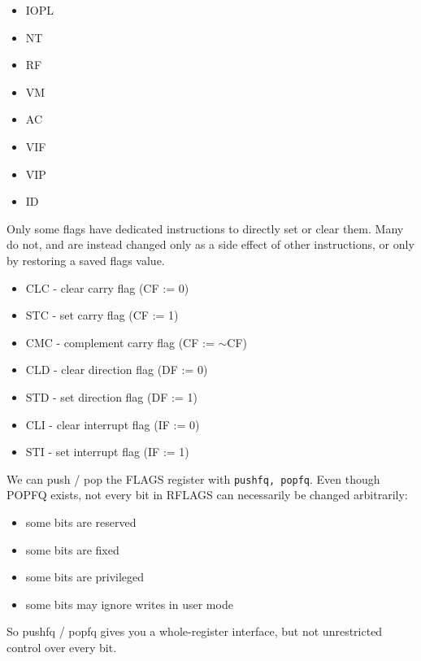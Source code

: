 \documentclass{report}
\begin{document}
\begin{itemize}
\begin{enumerate}
                    \begin{itemize}
                        \item IOPL
                        \item NT
                        \item RF
                        \item VM
                        \item AC
                        \item VIF
                        \item VIP
                        \item ID
                    \end{itemize} 
            \end{enumerate}
            Only some flags have dedicated instructions to directly set or clear them. Many do not, and are instead changed only as a side effect of other instructions, or only by restoring a saved flags value.
            \begin{itemize}
                \item CLC - clear carry flag (CF := 0)
                \item STC - set carry flag (CF := 1)
                \item CMC - complement carry flag (CF := $\sim$CF)
                \item CLD - clear direction flag (DF := 0)
                \item STD - set direction flag (DF := 1)
                \item CLI - clear interrupt flag (IF := 0)
                \item STI - set interrupt flag (IF := 1)
            \end{itemize}
            We can push / pop the FLAGS register with \texttt{pushfq, popfq}. Even though POPFQ exists, not every bit in RFLAGS can necessarily be changed arbitrarily:
            \begin{itemize}
                \item some bits are reserved
                \item some bits are fixed
                \item some bits are privileged
                \item some bits may ignore writes in user mode
            \end{itemize}
            So pushfq / popfq gives you a whole-register interface, but not unrestricted control over every bit.

\end{itemize}
\end{document}
